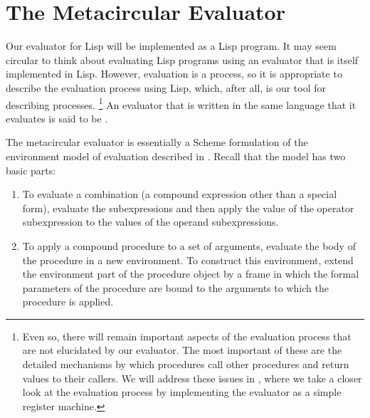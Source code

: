 \section{The Metacircular Evaluator}
\label{Section 4.1}

Our evaluator for Lisp will be implemented as a Lisp program.
It may seem circular to think about evaluating Lisp programs using an evaluator that is itself implemented in Lisp.
However, evaluation is a process, so it is appropriate to describe the evaluation process using Lisp, which, after all, is our tool for describing processes.%
\footnote{
	Even so, there will remain important aspects of the evaluation process that are not elucidated by our evaluator.
	The most important of these are the detailed mechanisms by which procedures call other procedures and return values to their callers.
	We will address these issues in , where we take a closer look at the evaluation process by implementing the evaluator as a simple register machine.
}
An evaluator that is written in the same language that it evaluates is said to be .

The metacircular evaluator is essentially a Scheme formulation of the environment model of evaluation described in .
Recall that the model has two basic parts:
\begin{enumerate}

	\item
		To evaluate a combination (a compound expression other than a special form), evaluate the subexpressions and then apply the value of the operator subexpression to the values of the operand subexpressions.

	\item
		To apply a compound procedure to a set of arguments, evaluate the body of the procedure in a new environment.
		To construct this environment, extend the environment part of the procedure object by a frame in which the formal parameters of the procedure are bound to the arguments to which the procedure is applied.

\end{enumerate}

